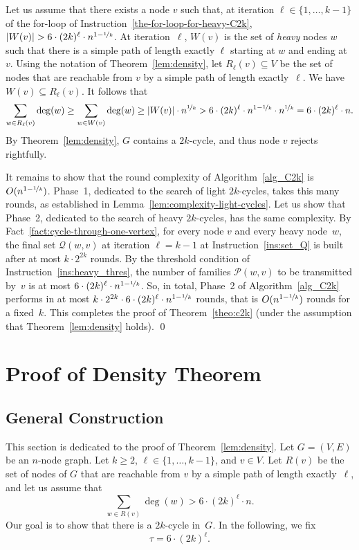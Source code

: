 \documentclass{article}
\newcommand{\lebontau}{6\cdot (2k)^\ell}
\begin{document}
Let us assume that there exists a node $v$ such that, at iteration $\ell\in\{1,\dots,k-1\}$ of the for-loop of Instruction~\ref{the-for-loop-for-heavy-C2k}, $|W(v)|> \lebontau \cdot n^{1-\nicefrac{1}{k}}$. At iteration~$\ell$, $W(v)$ is the set of \emph{heavy} nodes $w$ such that there is a simple path of length exactly $\ell$ starting at $w$ and ending at~$v$. 
Using the notation of Theorem~\ref{lem:density}, let $R_\ell(v)\subseteq V$ be the set of nodes that are reachable from $v$ by a simple path of length exactly~$\ell$. We have $W(v)\subseteq R_\ell(v)$. It follows that 
\begin{equation}\label{eq:correctness}
\sum_{w\in R_\ell(v)}\deg(w) 
\geq \sum_{w\in W(v)}\deg(w) 
\geq |W(v)|\cdot n^{\nicefrac{1}{k}} 
> \lebontau \cdot n^{1-\nicefrac{1}{k}} \cdot n^{\nicefrac{1}{k}}
= \lebontau \cdot n.
\end{equation}
By Theorem~\ref{lem:density}, $G$ contains a $2k$-cycle, and thus node $v$ rejects rightfully.

It remains to show that the round complexity of Algorithm~\ref{alg_C2k} is $O(n^{1-\nicefrac{1}{k}})$. Phase~1, dedicated to the search of light $2k$-cycles, takes this many rounds, as established in Lemma~\ref{lem:complexity-light-cycles}. Let us show that Phase~2, dedicated to the search of heavy $2k$-cycles, has the same complexity. By Fact~\ref{fact:cycle-through-one-vertex}, for every node $v$ and every heavy node~$w$, the final set $\mathcal{Q}(w,v)$ at iteration $\ell=k-1$ at Instruction~\ref{ins:set_Q} is built after at most $k\cdot 2^{2k}$ rounds. By the threshold condition of Instruction~\ref{ins:heavy_thres}, the number of families $\mathcal{P}(w,v)$ to be transmitted by~$v$ is at most $\lebontau\cdot n^{1-\nicefrac{1}{k}}$. So, in total, Phase~2 of  Algorithm~\ref{alg_C2k}  performs in at most $k \cdot 2^{2k} \cdot \lebontau \cdot n^{1-\nicefrac{1}{k}}$ rounds, that is $O(n^{1-\nicefrac{1}{k}})$ rounds for a fixed~$k$. This completes the proof of Theorem~\ref{theo:c2k} (under the assumption that Theorem~\ref{lem:density}
 holds). \qed

 
\section{Proof of Density Theorem}


\subsection{General Construction}
This section is dedicated to the proof of Theorem~\ref{lem:density}.
Let $G=(V,E)$ be an $n$-node graph. Let $k\geq 2$, $\ell\in\{1,\dots,k-1\}$, and $v\in V$. Let $R(v)$ be the set of nodes of $G$ that are reachable from $v$ by a simple path of length exactly~$\ell$, and let us assume that 
\[
\sum_{w\in R(v)}\deg(w)>\lebontau\cdot n.
\]
Our goal is to show  that there is a $2k$-cycle in~$G$. In the following, we fix 
\begin{equation}\label{eq:tau}
\tau = \lebontau.
\end{equation}
\end{document}
